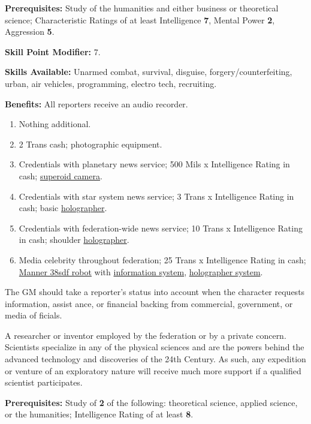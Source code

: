 \textbf{Prerequisites:} Study of the humanities and either business or
theoretical science; Characteristic Ratings of at least Intelligence
\textbf{7}, Mental Power \textbf{2}, Aggression \textbf{5}.

\textbf{Skill Point Modifier:} 7.

\textbf{Skills Available:}  Unarmed combat, survival, disguise,
   forgery/counterfeiting, urban, air vehicles, programming, electro
   tech, recruiting.

\pagebreak[2]
\textbf{Benefits:} All reporters receive an audio recorder.
\begin{enumerate}
\item Nothing additional.
\item 2 Trans cash; photographic equipment.
\item Credentials with planetary news service; 500 Mils x Intelligence
  Rating in cash; \hyperlink{tag:superoid}{superoid camera}.
\item Credentials with star system news service; 3 Trans x
  Intelligence Rating in cash; basic \hyperlink{tag:holographer}{holographer}.
\item Credentials with federation-wide news service; 10 Trans x
  Intelligence Rating in cash; shoulder \hyperlink{tag:holographer}{holographer}.
\item Media celebrity throughout federation; 25 Trans x Intelligence
  Rating in cash; \hyperlink{tag:bot-manner-38sdf}{Manner 38sdf robot} with \hyperlink{tag:bot-information}{information system},
  \hyperlink{tag:bot-holographer}{holographer system}.
\end{enumerate}

The GM should take a reporter's status into account when the character
requests information, assist ance, or financial backing from
commercial, government, or media of ficials.

\bigskip

\pagebreak[2]

\label{sec:prof-scientist}

A researcher or inventor employed by the federation or by a private
concern. Scientists specialize in any of the physical sciences and are
the powers behind the advanced technology and discoveries of the 24th
Century. As such, any expedition or venture of an exploratory nature
will receive much more support if a qualified scientist participates.

\textbf{Prerequisites:} Study of \textbf{2} of the following: theoretical
science, applied science, or the humanities; Intelligence Rating of at
least \textbf{8}.

